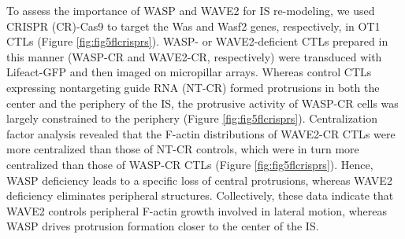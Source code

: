 To assess the importance of WASP and WAVE2 for IS re-modeling, we used CRISPR (CR)-Cas9 to target the Was and Wasf2 genes, respectively, in OT1 CTLs (Figure \ref{fig:fig5flcrisprs}). WASP- or WAVE2-deficient CTLs prepared in this manner (WASP-CR and WAVE2-CR, respectively) were transduced with Lifeact-GFP and then imaged on micropillar arrays. Whereas control CTLs expressing nontargeting guide RNA (NT-CR) formed protrusions in both the center and the periphery of the IS, the protrusive activity of WASP-CR cells was largely constrained to the periphery (Figure \ref{fig:fig5flcrisprs}). Centralization factor analysis revealed that the F-actin distributions of WAVE2-CR CTLs were more centralized than those of NT-CR controls, which were in turn more centralized than those of WASP-CR CTLs (Figure \ref{fig:fig5flcrisprs}). Hence, WASP deficiency leads to a specific loss of central protrusions, whereas WAVE2 deficiency eliminates peripheral structures. Collectively, these data indicate that WAVE2 controls peripheral F-actin growth involved in lateral motion, whereas WASP drives protrusion formation closer to the center of the IS.

